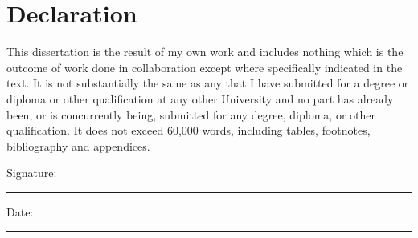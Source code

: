 \chapter*{Declaration}

\vfill

This dissertation is the result of my own work and includes nothing which is the outcome of work done in collaboration except where specifically indicated in the text. It is not substantially the same as any that I have submitted for a degree or diploma or other qualification at any other University and no part has already been, or is concurrently being, submitted for any degree, diploma, or other qualification. It does not exceed 60,000 words, including tables, footnotes, bibliography and appendices.\par

\vspace{10ex}

\begin{flushright}
Signature: \rule[0pt]{60mm}{0.5pt}

\vspace{5ex}

Date: \rule[0pt]{60mm}{0.5pt}
\end{flushright}

\vfill